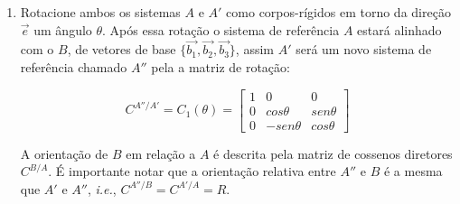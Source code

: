 \begin{enumerate}
\item Rotacione ambos os sistemas \begin{math} A\end{math} e \begin{math} A'\end{math} como corpos-rígidos em torno da direção \begin{math} \vec{e}\end{math} um ângulo \begin{math} \theta\end{math}. Após essa rotação o sistema de referência \begin{math} A\end{math} estará alinhado com o \begin{math} B\end{math}, de vetores de base \begin{math} \{\vec{b_1}, \vec{b_2}, \vec{b_3} \}\end{math}, assim \begin{math} A'\end{math} será um novo sistema de referência chamado \begin{math} A''\end{math} pela a matriz de rotação:

\begin{equation}C^{A''/A'}=C_1(\theta)=\begin{bmatrix}
1 & 0 & 0 \\ 0 & cos\theta & sen\theta \\ 0 & -sen\theta & cos\theta
\end{bmatrix}\end{equation}

A orientação de \begin{math} B\end{math} em relação a \begin{math} A\end{math} é descrita pela matriz de cossenos diretores \begin{math} C^{B/A}\end{math}. É importante notar que a orientação relativa entre \begin{math} A''\end{math} e \begin{math} B\end{math} é a mesma que \begin{math} A'\end{math} e \begin{math} A''\end{math}, \textit{i.e.}, \begin{math} C^{A''/B}=C^{A'/A}=R\end{math}.


\end{enumerate}
